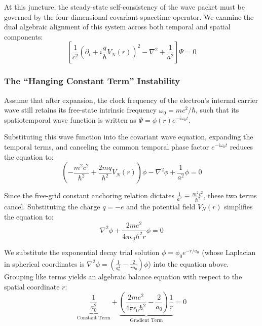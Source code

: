 \documentclass[12pt, a4paper]{article}
\begin{document}
At this juncture, the steady-state self-consistency of the wave packet must be governed by the four-dimensional covariant spacetime operator. We examine the dual algebraic alignment of this system across both temporal and spatial components:
\begin{equation}
    \left[ \frac{1}{c^2}\left(\partial_t + i\frac{q}{\hbar}V_N(r)\right)^2 - \nabla^2 + \frac{1}{a^2} \right] \Psi = 0 
\end{equation}

\subsubsection{The ``Hanging Constant Term'' Instability}

Assume that after expansion, the clock frequency of the electron's internal carrier wave still retains its free-state intrinsic frequency $\omega_0 = mc^2/\hbar$, such that its spatiotemporal wave function is written as $\Psi = \phi(r) e^{-i\omega_0 t}$.

Substituting this wave function into the covariant wave equation, expanding the temporal terms, and canceling the common temporal phase factor $e^{-i\omega_0 t}$ reduces the equation to:
\begin{equation}
    \left( -\frac{m^2 c^2}{\hbar^2} + \frac{2 m q}{\hbar^2} V_N(r) \right) \phi - \nabla^2 \phi + \frac{1}{a^2} \phi = 0 
\end{equation}

Since the free-grid constant anchoring relation dictates $\frac{1}{a^2} \equiv \frac{m^2 c^2}{\hbar^2}$, these two terms cancel. Substituting the charge $q = -e$ and the potential field $V_N(r)$ simplifies the equation to:
\begin{equation}
    \nabla^2 \phi + \frac{2 m e^2}{4\pi\epsilon_0 \hbar^2 r} \phi = 0 
\end{equation}

We substitute the exponential decay trial solution $\phi = \phi_0 e^{-r/a_0}$ (whose Laplacian in spherical coordinates is $\nabla^2 \phi = \left( \frac{1}{a_0^2} - \frac{2}{r a_0} \right) \phi$) into the equation above. Grouping like terms yields an algebraic balance equation with respect to the spatial coordinate $r$:
\begin{equation}
    \underbrace{\frac{1}{a_0^2}}_{\text{Constant Term}} + \underbrace{\left( \frac{2 m e^2}{4\pi\epsilon_0 \hbar^2} - \frac{2}{a_0} \right) \frac{1}{r}}_{\text{Gradient Term}} = 0 
\end{equation}
\end{document}
